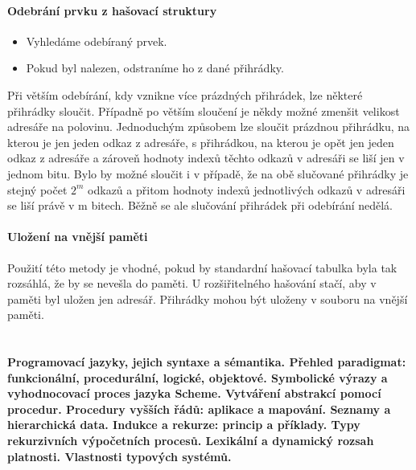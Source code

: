 \documentclass[10pt,a4paper]{article}
\begin{document}
\paragraph{Odebrání prvku z hašovací struktury}
\begin{itemize}
	\item Vyhledáme odebíraný prvek.
	\item Pokud byl nalezen, odstraníme ho z dané přihrádky.
\end{itemize}
Při větším odebírání, kdy vznikne více prázdných přihrádek, lze některé přihrádky sloučit. Případně po větším sloučení je někdy možné zmenšit velikost adresáře na polovinu. Jednoduchým způsobem lze sloučit prázdnou přihrádku, na kterou je jen jeden odkaz z adresáře, s přihrádkou, na kterou je opět jen jeden odkaz z adresáře a zároveň hodnoty indexů těchto odkazů v adresáři se liší jen v jednom bitu. Bylo by možné sloučit i v případě, že na obě slučované přihrádky je stejný počet $2^m$ odkazů a přitom hodnoty indexů jednotlivých odkazů v adresáři se liší právě v m bitech. Běžně se ale slučování přihrádek při odebírání nedělá.
\paragraph{Uložení na vnější paměti}
Použití této metody je vhodné, pokud by standardní hašovací tabulka byla tak rozsáhlá, že by se nevešla do paměti. U rozšiřitelného hašování stačí, aby v paměti byl uložen jen adresář. Přihrádky mohou být uloženy v souboru na vnější paměti.\\





\newpage
\section{}
\paragraph{Programovací jazyky, jejich syntaxe a sémantika. Přehled paradigmat: funkcionální, procedurální, logické, objektové. Symbolické výrazy a vyhodnocovací proces jazyka Scheme. Vytváření abstrakcí pomocí procedur. Procedury vyšších řádů: aplikace a mapování. Seznamy a hierarchická data. Indukce a rekurze: princip a příklady. Typy rekurzivních výpočetních procesů. Lexikální a dynamický rozsah platnosti. Vlastnosti typových systémů.}
\end{document}
